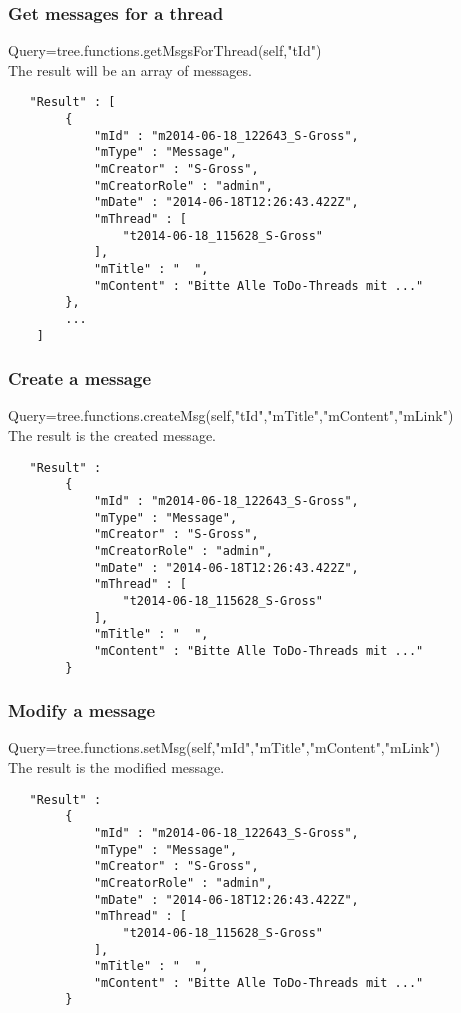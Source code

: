 \documentclass[12pt,a4paper,oneside]{report}
\begin{document}
\subsubsection{Get messages for a thread}
Query=tree.functions.getMsgsForThread(self,"tId")\\
The result will be an array of messages.
\begin{lstlisting}
   "Result" : [  
        { 
            "mId" : "m2014-06-18_122643_S-Gross",
            "mType" : "Message",
            "mCreator" : "S-Gross",
            "mCreatorRole" : "admin",
            "mDate" : "2014-06-18T12:26:43.422Z",
            "mThread" : [  
                "t2014-06-18_115628_S-Gross"
            ],
            "mTitle" : "  ",
            "mContent" : "Bitte Alle ToDo-Threads mit ..."
        },
        ...
    ]
\end{lstlisting}

\subsubsection{Create a message}
Query=tree.functions.createMsg(self,"tId","mTitle","mContent","mLink")\\
The result is the created message.
\begin{lstlisting}
   "Result" :   
        { 
            "mId" : "m2014-06-18_122643_S-Gross",
            "mType" : "Message",
            "mCreator" : "S-Gross",
            "mCreatorRole" : "admin",
            "mDate" : "2014-06-18T12:26:43.422Z",
            "mThread" : [  
                "t2014-06-18_115628_S-Gross"
            ],
            "mTitle" : "  ",
            "mContent" : "Bitte Alle ToDo-Threads mit ..."
        }
\end{lstlisting}

\subsubsection{Modify a message}
Query=tree.functions.setMsg(self,"mId","mTitle","mContent","mLink")\\
The result is the modified message.
\begin{lstlisting}
   "Result" :   
        { 
            "mId" : "m2014-06-18_122643_S-Gross",
            "mType" : "Message",
            "mCreator" : "S-Gross",
            "mCreatorRole" : "admin",
            "mDate" : "2014-06-18T12:26:43.422Z",
            "mThread" : [  
                "t2014-06-18_115628_S-Gross"
            ],
            "mTitle" : "  ",
            "mContent" : "Bitte Alle ToDo-Threads mit ..."
        }
\end{lstlisting}
\end{document}

